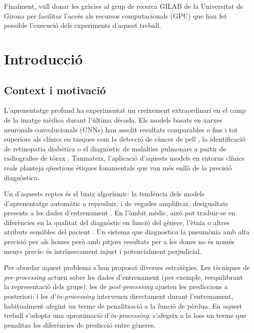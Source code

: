 \documentclass[a4paper,12pt,twoside]{ThesisStyle}
\begin{document}
Finalment, vull donar les gràcies al grup de recerca GILAB de la Universitat de Girona per facilitar l'accés als recursos computacionals (GPU) que han fet possible l'execució dels experiments d'aquest treball.


\tableofcontents

\mainmatter

\chapter{Introducció}
\label{cap:intro}

\section{Context i motivació}

L'aprenentatge profund ha experimentat un creixement extraordinari en el camp de la imatge mèdica durant l'última dècada. Els models basats en xarxes neuronals convolucionals (CNNs) han assolit resultats comparables o fins i tot superiors als clínics en tasques com la detecció de càncer de pell \cite{Esteva2017}, la identificació de retinopatia diabètica \cite{Gulshan2016} o el diagnòstic de malalties pulmonars a partir de radiografies de tòrax \cite{Rajpurkar2018}. Tanmateix, l'aplicació d'aquests models en entorns clínics reals planteja qüestions ètiques fonamentals que van més enllà de la precisió diagnòstica.

Un d'aquests reptes és el biaix algorísmic: la tendència dels models d'aprenentatge automàtic a reproduir, i de vegades amplificar, desigualtats presents a les dades d'entrenament \cite{Mehrabi2021}. En l'àmbit mèdic, això pot traduir-se en diferències en la qualitat del diagnòstic en funció del gènere, l'ètnia o altres atributs sensibles del pacient \cite{Larrazabal2020, SeyyedKalantari2021}. Un sistema que diagnostica la pneumònia amb alta precisió per als homes però amb pitjors resultats per a les dones no és només menys precís: és intrínsecament injust i potencialment perjudicial.

Per abordar aquest problema s'han proposat diverses estratègies. Les tècniques de \textit{pre-processing} actuen sobre les dades d'entrenament (per exemple, reequilibrant la representació dels grups); les de \textit{post-processing} ajusten les prediccions a posteriori; i les d'\textit{in-processing} intervenen directament durant l'entrenament, habitualment afegint un terme de penalització a la funció de pèrdua. En aquest treball s'adopta una aproximació d'\textit{in-processing}: s'afegeix a la loss un terme que penalitza les diferències de predicció entre gèneres.
\end{document}
